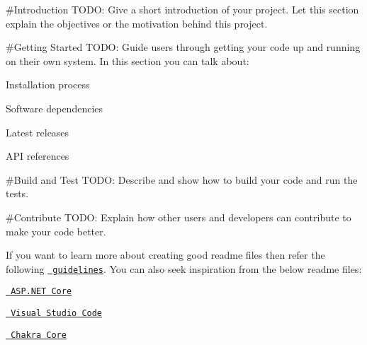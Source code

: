 \#\+Introduction T\+O\+DO\+: Give a short introduction of your project. Let this section explain the objectives or the motivation behind this project.

\#\+Getting Started T\+O\+DO\+: Guide users through getting your code up and running on their own system. In this section you can talk about\+:
\begin{DoxyEnumerate}
\item Installation process
\item Software dependencies
\item Latest releases
\item A\+PI references
\end{DoxyEnumerate}

\#\+Build and Test T\+O\+DO\+: Describe and show how to build your code and run the tests.

\#\+Contribute T\+O\+DO\+: Explain how other users and developers can contribute to make your code better.

If you want to learn more about creating good readme files then refer the following \href{https://www.visualstudio.com/en-us/docs/git/create-a-readme}{\texttt{ guidelines}}. You can also seek inspiration from the below readme files\+:
\begin{DoxyItemize}
\item \href{https://github.com/aspnet/Home}{\texttt{ A\+S\+P.\+N\+ET Core}}
\item \href{https://github.com/Microsoft/vscode}{\texttt{ Visual Studio Code}}
\item \href{https://github.com/Microsoft/ChakraCore}{\texttt{ Chakra Core}} 
\end{DoxyItemize}